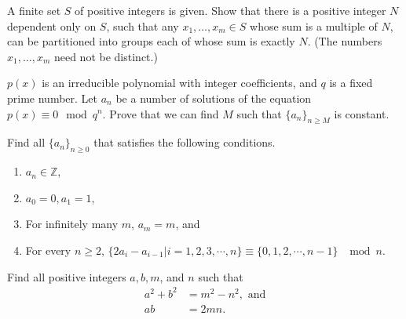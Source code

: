 \documentclass[problems.tex]{subfile}
\begin{document}
	\begin{problem}
		A finite set $S$ of positive integers is given. Show that there is a positive integer $N$ dependent only on $S$, such that any $x_1, \dots, x_m \in S$ whose sum is a multiple of $N$, can be partitioned into groups each of whose sum is exactly $N$. (The numbers $x_1, \dots, x_m$ need not be distinct.) %
	\end{problem}
	
	
	
	\begin{problem}
		$p(x)$ is an irreducible polynomial with integer coefficients, and $q$ is a fixed prime number. Let $a_n$ be a number of solutions of the equation $p(x)\equiv 0\mod q^n$. Prove that we can find $M$ such that $\{a_n\}_{n\ge M}$ is constant. %
	\end{problem}
	
	
	
	
	
	\begin{problem}
		Find all $\{a_n\}_{n\ge 0}$ that satisfies the following conditions.
		\begin{enumerate}
			\item $a_n\in \mathbb{Z}$,
			\item $a_0=0, a_1=1$,
			\item For infinitely many $m$, $a_m=m$, and
			\item For every $n\ge2$, $\{2a_i-a_{i-1} | i=1, 2, 3, \cdots , n\}\equiv \{0, 1, 2, \cdots , n-1\}$ $\mod n$.
		\end{enumerate}
	\end{problem}
	
	
	
	
	\begin{problem}
		Find all positive integers $a, b, m$, and $n$ such that
		\begin{align*}
			a^2+b^2 &=m^2-n^2, \text{ and}\\
			ab &=2mn.
		\end{align*}
	\end{problem}
	
\end{document}
